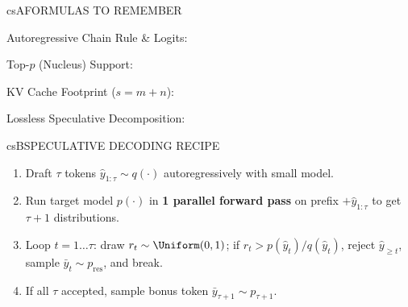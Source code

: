 \documentclass[../../../../master.tex]{subfiles}
\begin{document}

\csnextpage

\begin{cscolumns}
\begin{cscard}{csA}{FORMULAS TO REMEMBER}
  \begin{csbul}
    \item Autoregressive Chain Rule \& Logits:
    \item Top-$p$ (Nucleus) Support:
    \item KV Cache Footprint ($s = m + n$):
    \item Lossless Speculative Decomposition:
  \end{csbul}
\end{cscard}

\begin{cscard}{csB}{SPECULATIVE DECODING RECIPE}
  \begin{enumerate}[leftmargin=1.2em, itemsep=1pt, topsep=1pt, parsep=0pt]
    \item Draft $\tau$ tokens $\hat{y}_{1:\tau} \sim q(\cdot)$ autoregressively with small model.
    \item Run target model $p(\cdot)$ in \textbf{1 parallel forward pass} on prefix $+ \hat{y}_{1:\tau}$ to get $\tau{+}1$ distributions.
    \item Loop $t=1\dots\tau$: draw $r_t\sim\Uniform(0,1)$; if $r_t > p(\hat{y}_t)/q(\hat{y}_t)$, reject $\hat{y}_{\ge t}$, sample $\bar{y}_t \sim p_{\mathrm{res}}$, and break.
    \item If all $\tau$ accepted, sample bonus token $\bar{y}_{\tau+1}\sim p_{\tau+1}$.
  \end{enumerate}
\end{cscard}
\columnbreak


\end{cscolumns}
\end{document}
